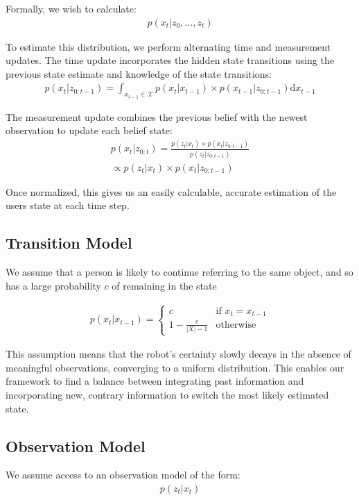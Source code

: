\documentclass[a4paper, 11pt]{article} %
\begin{document}
Formally, we wish to calculate:
\begin{align}
p(x_t | z_0, \dots, z_t)
\end{align}

To estimate this distribution, we perform alternating time and measurement updates. The time update incorporates the hidden state transitions using the previous state estimate and knowledge of the state transitions:
\begin{align}
p(x_t | z_{0:t-1}) = \int_{x_{t-1} \in \mathcal{X}} p(x_t|x_{t-1})\times p(x_{t-1} | z_{0:t-1}) \text{d}x_{t-1}
\end{align}

The measurement update combines the previous belief with the newest observation to update each belief state: 
\begin{align}
p(x_t |z_{0:t}) = \frac{p(z_t | x_t) \times p(x_t | z_{0:t-1})}{p(z_t | z_{0:t-1})} \\\propto p(z_t | x_t) \times p(x_t | z_{0:t-1})
\end{align}

Once normalized, this gives us an easily calculable, accurate estimation of the users state at each time step.
\subsection{Transition Model}
We assume that a person is likely to continue referring to the same
object, and so has a large probability $c$ of remaining in the state

\begin{align}
p(x_t | x_{t-1}) = \left\{  \begin{array}{ll}
c&\mbox{if } x_t = x_{t-1}\\
1-\frac{c}{|X|-1}&\mbox{otherwise}
\end{array}\right.
\end{align}

This assumption means that the robot's certainty slowly decays in the absence of meaningful observations, converging to a uniform distribution. This enables our framework to find a balance between integrating past information and incorporating new, contrary information to switch the most likely estimated state.
\subsection{Observation Model}
We assume access to an observation model of the form:
\begin{align}
p(z_t | x_t)
\end{align}
\end{document}
